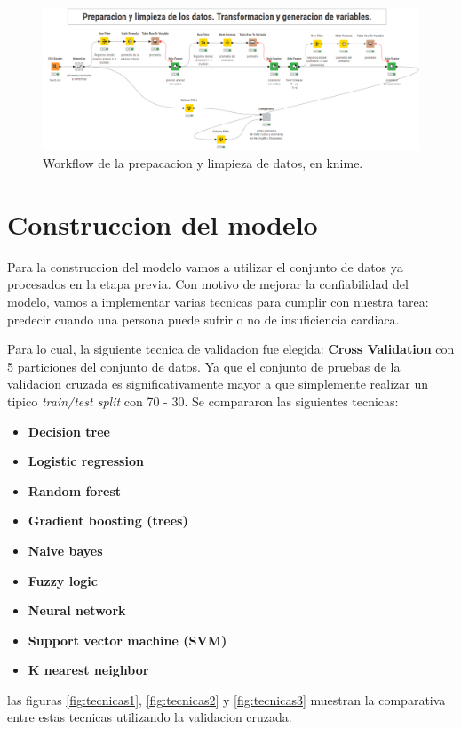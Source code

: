 \documentclass[12pt, letterpaper]{article}
\begin{document}
\begin{figure}
    \centering
    \includegraphics[scale=0.37]{entrega3.png}
    \caption{Workflow de la prepacacion y limpieza de datos, en knime.}
    \label{fig:Workflow3}
\end{figure}

\section{Construccion del modelo}
Para la construccion del modelo vamos a utilizar el conjunto de datos ya procesados en la 
etapa previa. 
Con motivo de mejorar la confiabilidad del modelo, vamos a implementar varias tecnicas para 
cumplir con nuestra tarea: predecir cuando una persona puede sufrir o no de 
insuficiencia cardiaca. 

Para lo cual, la siguiente tecnica de validacion fue elegida: \textbf{Cross Validation}
con 5 particiones del conjunto de datos. Ya que el conjunto de pruebas de la validacion 
cruzada es significativamente mayor a que simplemente realizar un tipico \textit{train/test split}
con 70 - 30. Se compararon las siguientes tecnicas:
\begin{itemize}
    \item{\textbf{Decision tree}} 
    \item{\textbf{Logistic regression}} 
    \item{\textbf{Random forest}} 
    \item{\textbf{Gradient boosting (trees)}} 
    \item{\textbf{Naive bayes}} 
    \item{\textbf{Fuzzy logic}} 
    \item{\textbf{Neural network}} 
    \item{\textbf{Support vector machine (SVM)}} 
    \item{\textbf{K nearest neighbor}}
\end{itemize}
las figuras \ref{fig:tecnicas1}, \ref{fig:tecnicas2} y \ref{fig:tecnicas3} muestran la comparativa
entre estas tecnicas utilizando la validacion cruzada.
\end{document}
